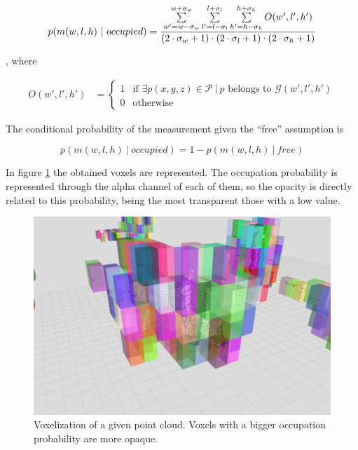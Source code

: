 \begin{equation}\label{eq:cp05_conditional_prob}
p(m(w,l,h)~|~occupied) = {
{\sum \limits_{w'=w-\sigma_w}^{w+\sigma_w} \sum \limits_{l'=l-\sigma_l}^{l+\sigma_l} \sum \limits_{h'=h-\sigma_h}^{h+\sigma_h} O(w',l',h')} 
\over 
{(2 \cdot \sigma_w + 1) \cdot (2 \cdot \sigma_l + 1) \cdot (2 \cdot \sigma_h + 1)}}
\end{equation}

, where

\begin{equation}\label{eq:cp05_occupied}
\begin{align*}
 O(w', l', h') &=
  \begin{cases}
   1        & \text{if } %
   {\exists p(x, y, z) \in \mathcal{P} ~|~ p \text{ belongs to } \mathcal{G}(w', l', h')}%
   \\
   0        & \text{otherwise}
  \end{cases}
\end{align*}
\end{equation}

The conditional probability of the measurement given the “free” assumption is

\begin{equation}\label{eq:cp05_conditional_prob_2}
p(m(w,l,h)~|~occupied) = 1 - p(m(w,l,h)~|~free)
\end{equation}

In figure \ref{fig:cp05_voxelization} the obtained voxels are represented. The occupation probability is represented through the alpha channel of each of them, so the opacity is directly related to this probability, being the most transparent those with a low value.

\begin{figure}[t]
  \centering
  \includegraphics{voxelization}
  \caption{Voxelization of a given point cloud. Voxels with a bigger occupation probability are more opaque.}\label{fig:cp05_voxelization}
\end{figure}

